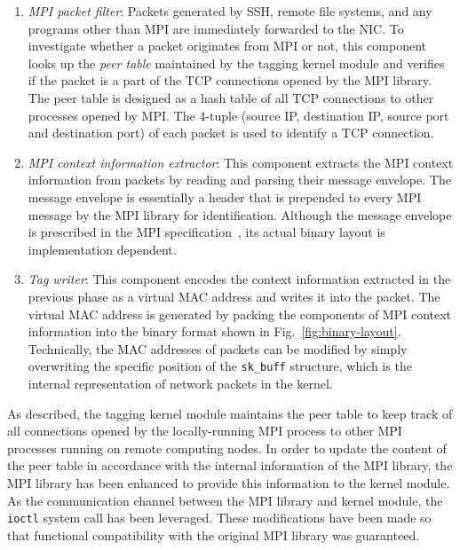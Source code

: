 \begin{enumerate}
\def\labelenumi{\arabic{enumi}.}
\item
  \emph{MPI packet filter}: Packets generated by SSH, remote file
  systems, and any programs other than MPI are immediately forwarded to
  the NIC\@. To investigate whether a packet originates from MPI or not,
  this component looks up the \emph{peer table} maintained by the
  tagging kernel module and verifies if the packet is a part of the TCP
  connections opened by the MPI library. The peer table is designed as a
  hash table of all TCP connections to other processes opened by MPI\@.
  The 4-tuple (source IP, destination IP, source port and destination
  port) of each packet is used to identify a TCP connection.
\item
  \emph{MPI context information extractor}: This component extracts the
  MPI context information from packets by reading and parsing their
  message envelope. The message envelope is essentially a header that is
  prepended to every MPI message by the MPI library for identification.
  Although the message envelope is prescribed in the MPI
  specification~\autocite{MessagePassingInterfaceForum2015}, its actual binary
  layout is implementation dependent.
\item
  \emph{Tag writer}: This component encodes the context information
  extracted in the previous phase as a virtual MAC address and writes it
  into the packet. The virtual MAC address is generated by packing the
  components of MPI context information into the binary format shown in
  Fig.~\ref{fig:binary-layout}. Technically, the MAC addresses of
  packets can be modified by simply overwriting the specific position of
  the \lstinline!sk_buff! structure, which is the
  internal representation of network packets in the kernel.
\end{enumerate}

As described, the tagging kernel module maintains the peer table to keep
track of all connections opened by the locally-running MPI process to
other MPI processes running on remote computing nodes. In order to
update the content of the peer table in accordance with the internal
information of the MPI library, the MPI library has been enhanced to
provide this information to the kernel module. As the communication
channel between the MPI library and kernel module, the
\lstinline!ioctl! system call has been leveraged. These
modifications have been made so that functional compatibility with the
original MPI library was guaranteed.


